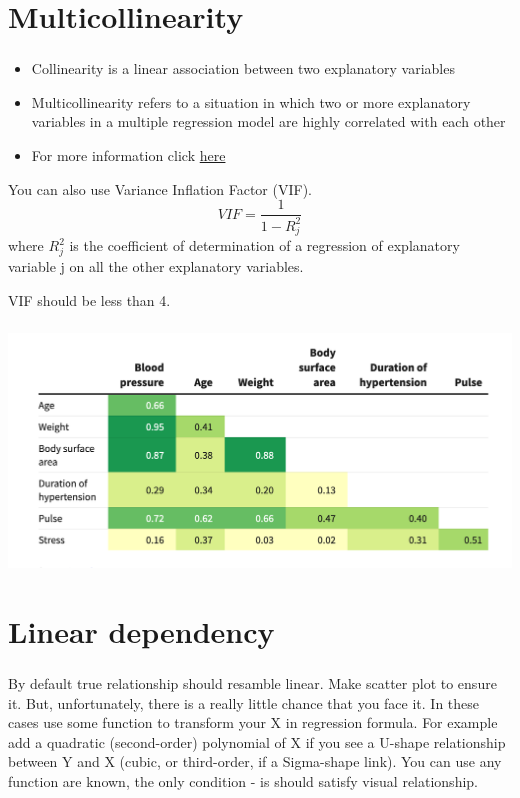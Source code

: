 \documentclass[t, 11pt]{beamer}
\begin{document}
	\section{Multicollinearity}
	\begin{frame} 
		\frametitle{\insertsection} 
		\begin{itemize}
		\item Collinearity is a linear association between two explanatory variables
		\item Multicollinearity refers to a situation in which two or more explanatory variables in a multiple regression model are highly correlated with each other
		\item 	For more information click \href{https://dspace.mit.edu/bitstream/handle/1721.1/48530/multicollinearit00farr.pdf?sequence=1	}{here}
		\end{itemize}
	
	You can also use Variance Inflation Factor (VIF).
		$$
		VIF  = \frac{1}{1 - R^2_j}
		$$
	where $R^2_j$ is the coefficient of determination of a regression of explanatory variable j on all the other explanatory variables.
	
	VIF should be less than 4.
	\end{frame}

\begin{frame} 
	\frametitle{\insertsection}
	 \begin{center}
		\includegraphics[scale=0.4]{multicol1}
	\end{center}
\end{frame}	

	\section{Linear dependency}
\begin{frame} 
	\frametitle{\insertsection} 
	 By default true relationship should resamble linear. Make scatter plot to ensure it. But, unfortunately, there is a really little chance that you face it. In these cases use some function to transform your X in regression formula. For example add a quadratic (second-order) polynomial of X if you see a U-shape relationship between Y and X (cubic, or third-order, if a Sigma-shape link). You can use any function are known, the only condition - is should satisfy visual relationship. 
\end{frame}	
\end{document}
